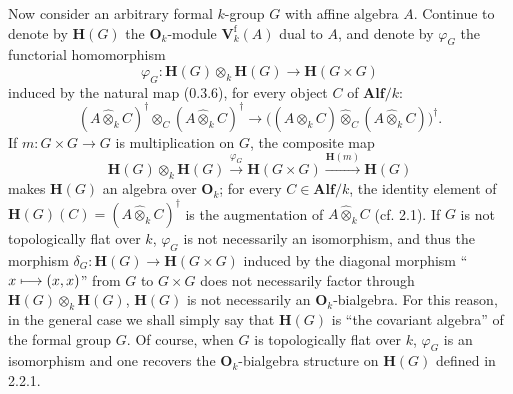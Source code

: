 Now consider an arbitrary formal $k$-group $G$ with affine algebra $A$. Continue to denote by $\mathbf H(G)$ the $\mathbf O_k$-module $\mathbf V_k^{\mathrm f}(A)$ dual to $A$, and denote by $\varphi_G$ the functorial homomorphism
\[
\varphi_G:\mathbf H(G)\otimes_k\mathbf H(G)\to\mathbf H(G\times G)
\]
induced by the natural map (0.3.6), for every object $C$ of $\mathbf{Alf}/k$:
\[
(A\widehat\otimes_k C)^\dagger\otimes_C(A\widehat\otimes_k C)^\dagger
\to\bigl((A\widehat\otimes_k C)\widehat\otimes_C(A\widehat\otimes_k C)\bigr)^\dagger.
\]
If $m:G\times G\to G$ is multiplication on $G$, the composite map
\[
\mathbf H(G)\otimes_k\mathbf H(G)\xrightarrow{\varphi_G}\mathbf H(G\times G)\xrightarrow{\mathbf H(m)}\mathbf H(G)
\]
makes $\mathbf H(G)$ an algebra over $\mathbf O_k$; for every $C\in\mathbf{Alf}/k$, the identity element of $\mathbf H(G)(C)=(A\widehat\otimes_k C)^\dagger$ is the augmentation of $A\widehat\otimes_k C$ (cf. 2.1). If $G$ is not topologically flat over $k$, $\varphi_G$ is not necessarily an isomorphism, and thus the morphism $\delta_G:\mathbf H(G)\to\mathbf H(G\times G)$ induced by the diagonal morphism ``$x\longmapsto(x,x)$'' from $G$ to $G\times G$ does not necessarily factor through $\mathbf H(G)\otimes_k\mathbf H(G)$, \ie $\mathbf H(G)$ is not necessarily an $\mathbf O_k$-bialgebra.
For this reason, in the general case we shall simply say that $\mathbf H(G)$ is ``the covariant algebra'' of the formal group $G$.
Of course, when $G$ is topologically flat over $k$, $\varphi_G$ is an isomorphism and one recovers the $\mathbf O_k$-bialgebra structure on $\mathbf H(G)$ defined in 2.2.1.

